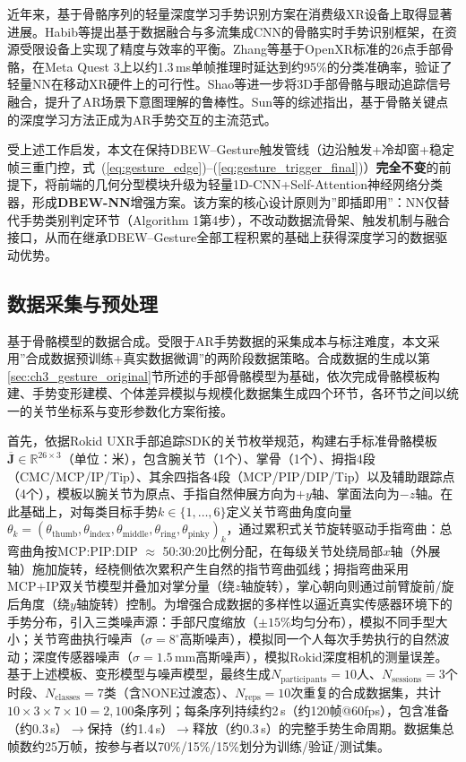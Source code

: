 近年来，基于骨骼序列的轻量深度学习手势识别方案在消费级XR设备上取得显著进展。Habib等\cite{habib2025skeleton_hgr}提出基于数据融合与多流集成CNN的骨骼实时手势识别框架，在资源受限设备上实现了精度与效率的平衡。Zhang等\cite{openxr2025gesture}基于OpenXR标准的26点手部骨骼，在Meta Quest 3上以约1.3\,ms单帧推理时延达到约95\%的分类准确率，验证了轻量NN在移动XR硬件上的可行性。Shao等\cite{shao2024cv_gesture}进一步将3D手部骨骼与眼动追踪信号融合，提升了AR场景下意图理解的鲁棒性。Sun等\cite{sun2024ar_gesture_survey}的综述指出，基于骨骼关键点的深度学习方法正成为AR手势交互的主流范式。

受上述工作启发，本文在保持DBEW--Gesture触发管线（边沿触发+冷却窗+稳定帧三重门控，式~(\ref{eq:gesture_edge})--(\ref{eq:gesture_trigger_final})）\textbf{完全不变}的前提下，将前端的几何分型模块升级为轻量1D-CNN+Self-Attention神经网络分类器，形成\textbf{DBEW-NN}增强方案。该方案的核心设计原则为”即插即用”：NN仅替代手势类别判定环节（Algorithm 1第4步），不改动数据流骨架、触发机制与融合接口，从而在继承DBEW--Gesture全部工程积累的基础上获得深度学习的数据驱动优势。

\subsection{数据采集与预处理}
基于骨骼模型的数据合成。受限于AR手势数据的采集成本与标注难度，本文采用”合成数据预训练+真实数据微调”的两阶段数据策略。合成数据的生成以第\ref{sec:ch3_gesture_original}节所述的手部骨骼模型为基础，依次完成骨骼模板构建、手势变形建模、个体差异模拟与规模化数据集生成四个环节，各环节之间以统一的关节坐标系与变形参数化方案衔接。

首先，依据Rokid UXR手部追踪SDK的关节枚举规范，构建右手标准骨骼模板$\overline{\mathbf{J}}\in\mathbb{R}^{26\times3}$（单位：米），包含腕关节（1个）、掌骨（1个）、拇指4段（CMC/MCP/IP/Tip）、其余四指各4段（MCP/PIP/DIP/Tip）以及辅助跟踪点（4个），模板以腕关节为原点、手指自然伸展方向为$+y$轴、掌面法向为$-z$轴。在此基础上，对每类目标手势$k\in\{1,\ldots,6\}$定义关节弯曲角度向量$\theta_k=(\theta_{\mathrm{thumb}},\theta_{\mathrm{index}},\theta_{\mathrm{middle}},\theta_{\mathrm{ring}},\theta_{\mathrm{pinky}})_k$，通过累积式关节旋转驱动手指弯曲：总弯曲角按MCP:PIP:DIP $\approx$ 50:30:20比例分配，在每级关节处绕局部$x$轴（外展轴）施加旋转，经桡侧依次累积产生自然的指节弯曲弧线；拇指弯曲采用MCP+IP双关节模型并叠加对掌分量（绕$z$轴旋转），掌心朝向则通过前臂旋前/旋后角度（绕$y$轴旋转）控制。为增强合成数据的多样性以逼近真实传感器环境下的手势分布，引入三类噪声源：手部尺度缩放（$\pm15\%$均匀分布），模拟不同手型大小；关节弯曲执行噪声（$\sigma=8^\circ$高斯噪声），模拟同一个人每次手势执行的自然波动；深度传感器噪声（$\sigma=1.5$\,mm高斯噪声），模拟Rokid深度相机的测量误差。基于上述模板、变形模型与噪声模型，最终生成$N_{\mathrm{participants}}=10$人、$N_{\mathrm{sessions}}=3$个时段、$N_{\mathrm{classes}}=7$类（含NONE过渡态）、$N_{\mathrm{reps}}=10$次重复的合成数据集，共计$10\times3\times7\times10=2,100$条序列；每条序列持续约2\,s（约120帧@60fps），包含准备（约0.3\,s）$\rightarrow$保持（约1.4\,s）$\rightarrow$释放（约0.3\,s）的完整手势生命周期。数据集总帧数约25万帧，按参与者以70\%/15\%/15\%划分为训练/验证/测试集。

